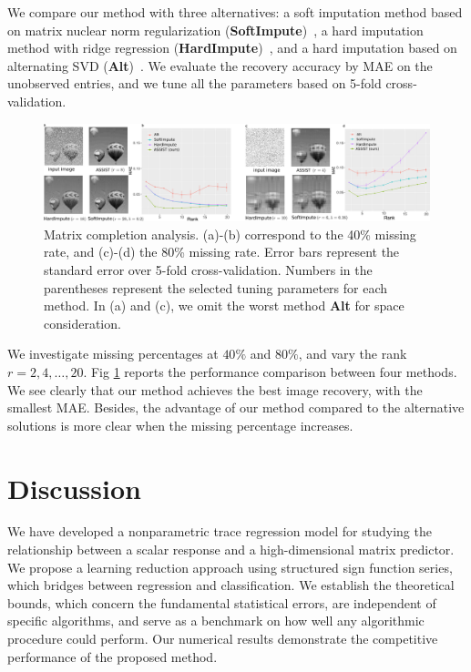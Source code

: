 \documentclass[aos]{imsart}
\theoremstyle{definition}
\begin{document}
We compare our method with three alternatives: a soft imputation method based on matrix nuclear norm regularization ({\bf \footnotesize SoftImpute})~\cite{hastie2015matrix}, a hard imputation method with ridge regression ({\bf \footnotesize HardImpute})~\cite{mazumder2010spectral}, and a hard imputation based on alternating SVD ({\bf \footnotesize Alt})~\cite{rennie2005fast}. We evaluate the recovery accuracy by MAE on the unobserved entries, and we tune all the parameters based on 5-fold cross-validation. 

\begin{figure}[h!]
\includegraphics[width = \textwidth]{figure/completion.pdf}
\caption{Matrix completion analysis. (a)-(b) correspond to the 40\% missing rate, and (c)-(d) the 80\% missing rate. Error bars represent the standard error over 5-fold cross-validation. Numbers in the parentheses represent the selected tuning parameters for each method. In (a) and (c), we omit the worst method {\bf \scriptsize Alt} for space consideration.}
\label{fig:braincv}
\end{figure}

We investigate missing percentages at $40\%$ and $80\%$, and vary the rank $r=2,4,\ldots,20$. Fig \ref{fig:braincv} reports the performance comparison between four methods. We see clearly that our method achieves the best image recovery, with the smallest MAE. Besides, the advantage of our method compared to the alternative solutions is more clear when the missing percentage increases. 





\section{Discussion}
\label{sec:discussion}

We have developed a nonparametric trace regression model for studying the relationship between a scalar response and a high-dimensional matrix predictor. We propose a learning reduction approach using structured sign function series, which bridges between regression and classification. We establish the theoretical bounds, which concern the fundamental statistical errors, are independent of specific algorithms, and serve as a benchmark on how well any algorithmic procedure could perform. Our numerical results demonstrate the competitive performance of the proposed method.
\end{document}
